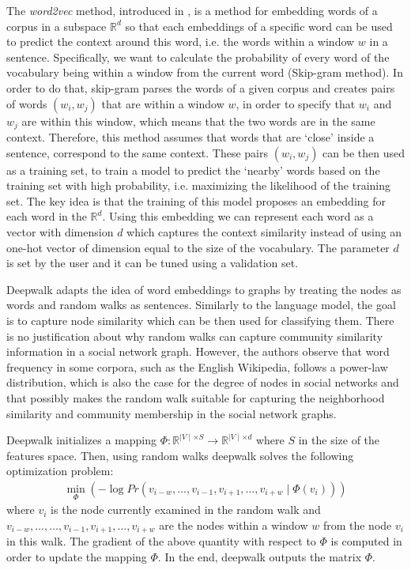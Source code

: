 The \emph{word2vec} method, introduced in \cite{mikolov2013efficient}, is a
method for embedding words of a corpus in a subspace $\mathbb{R}^d$ so that
each embeddings of a specific word can be used to predict the context around this
word, i.e. the words within a window $w$ in a sentence. Specifically, we
want to calculate the probability of every word of the vocabulary being
within a window from the current word (Skip-gram method).
In order to do that, skip-gram parses the words of a given corpus and creates
pairs of words $(w_i, w_j)$ that are within a window $w$, in order to specify
that $w_i$ and $w_j$ are within this window, which means that the two words
are in the same context. Therefore, this method assumes that words that are
`close' inside a sentence, correspond to the same context. These pairs
$(w_i, w_j)$ can be then used as a training set, to train a model to predict the
`nearby' words based on the training set with high probability, i.e. maximizing
the likelihood of the training set. The key idea is that the training of this
model proposes an embedding for each word in the $\mathbb{R}^d$.
Using this embedding we can represent each word as a vector with dimension $d$
which captures the context similarity instead of using an one-hot vector of
dimension equal to the size of the vocabulary. The parameter $d$ is set by the
user and it can be tuned using a validation set.

Deepwalk adapts the idea of word embeddings to graphs by treating the nodes as
words and random walks as sentences. Similarly to the language model, the goal
is to capture node similarity which can be then used for classifying them.
There is no justification about why random walks can capture community
similarity information in a social network graph. However, the authors
observe that word frequency in some corpora, such as the English Wikipedia,
follows a power-law distribution, which is also the case for the degree of nodes
in social networks and that
possibly makes the random walk suitable for capturing the neighborhood
similarity and community membership in the social network graphs.

Deepwalk initializes a mapping
$\Phi: \mathbb{R}^{\mid V \mid \times S} \to \mathbb{R}^{\mid V\mid \times d}$
where $S$ in the size of the features space. Then, using random walks deepwalk 
solves the following optimization problem:
\begin{align}
    \min_{\Phi}
        \left (-\log{Pr({v_{i-w},
                \ldots, v_{i-1}, v_{i+1},
                \ldots , v_{i+w}} \mid \Phi(v_i))}
        \right )
\end{align}
where $v_i$ is the node currently examined in the random walk and
$v_{i-w}, \ldots, \ldots, v_{i-1}, v_{i+1},\ldots, v_{i+w}$ are the nodes
within a window $w$ from the node $v_i$ in this walk. The gradient of the above
quantity with respect to $\Phi$ is
computed in order to update the mapping $\Phi$. In the end, deepwalk outputs
the matrix $\Phi$.

